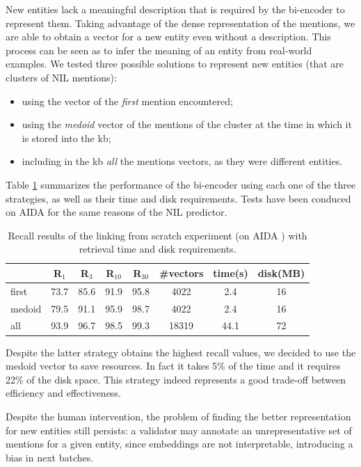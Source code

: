 New entities lack a meaningful description that is required by the bi-encoder to represent them. Taking advantage of the dense representation of the mentions, we are able to obtain a vector for a new entity even without a description.
This process can be seen as to infer the meaning of an entity from real-world examples.
We tested three possible solutions to represent new entities (that are clusters of NIL mentions):
\begin{itemize}
    \item using the vector of the \textit{first} mention encountered;
    \item using the \textit{medoid} vector of the mentions of the cluster at the time in which it is stored into the \ac{kb};
    \item including in the \ac{kb} \textit{all} the mentions vectors, as they were different entities.
\end{itemize}

Table \ref{tab:new_entities_recall} summarizes the performance of the bi-encoder using each one of the three strategies, as well as their time and disk requirements. Tests have been conduced on AIDA for the same reasons of the NIL predictor.
\begin{table}
    \centering
    \caption{Recall results of the linking from scratch experiment (on AIDA \cite{aida}) with retrieval time and disk requirements.
    }
    \begin{tabular}{l|cccc|ccc}
         &  R$_{1}$ & R$_{3}$ & R$_{10}$ & R$_{30}$ & \#vectors & time(s) & disk(MB) \\
         \hline
         first  & 73.7 & 85.6 & 91.9 & 95.8 &  4022 &  2.4 & 16\\
         medoid & 79.5 & 91.1 & 95.9 & 98.7 &  4022 &  2.4 & 16\\
         all    & 93.9 & 96.7 & 98.5 & 99.3 &  18319 &  44.1 & 72
    \end{tabular}
    \label{tab:new_entities_recall}
\end{table}

Despite the latter strategy obtains the highest recall values, we decided to use the medoid vector to save resources. In fact it takes 5\% of the time and it requires 22\% of the disk space. This strategy indeed represents a good trade-off between efficiency 
and effectiveness.


Despite the human intervention,
the problem of finding the better representation for new entities still persists: a validator may annotate an unrepresentative set of mentions for a given entity, since embeddings are not interpretable, introducing a bias in next batches.

